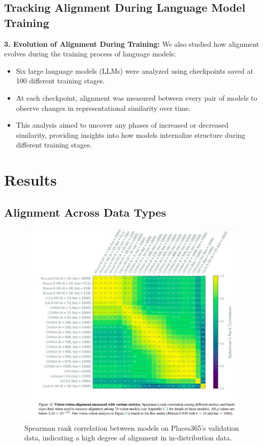 \documentclass[10pt,a4paper]{article}
\begin{document}
\subsection{Tracking Alignment During Language Model Training}
\textbf{3. Evolution of Alignment During Training:} We also studied how alignment evolves during the training process of language models:
\begin{itemize}
    \item Six large language models (LLMs) were analyzed using checkpoints saved at 100 different training stages.
    \item At each checkpoint, alignment was measured between every pair of models to observe changes in representational similarity over time.
    \item This analysis aimed to uncover any phases of increased or decreased similarity, providing insights into how models internalize structure during different training stages.
\end{itemize}



\section{Results}
\subsection{Alignment Across Data Types}
\begin{figure}[H]
    \centering
    \includegraphics[width=\textwidth]{prh_correlation.jpg}
    \caption{Spearman rank correlation between models on Places365's validation data, indicating a high degree of alignment in in-distribution data.}
    \label{fig:prh_correlation}
\end{figure}
\end{document}
